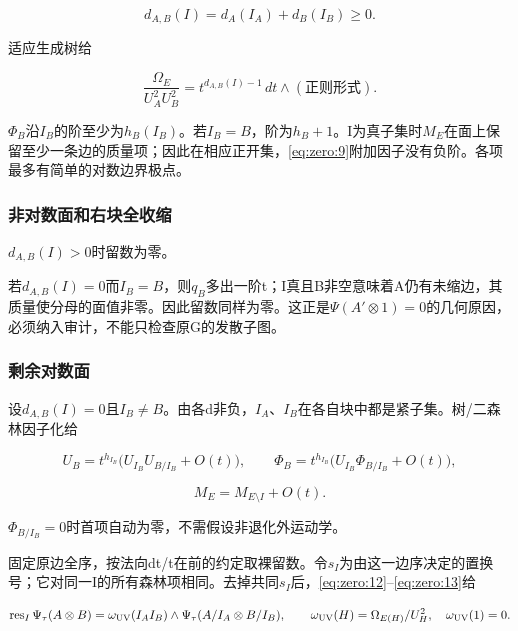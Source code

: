 \documentclass[11pt,a4paper,oneside]{ctexart}
\theoremstyle{cnplain}
\theoremstyle{definition}
\theoremstyle{remark}
\numberwithin{equation}{section}
\begin{document}
\begin{equation}
d_{A,B}(I)=d_A(I_A)+d_B(I_B)\geq0.
\end{equation}

适应生成树给

\begin{equation}
\frac{\Omega_E}{U_A^2U_B^2}
       =t^{d_{A,B}(I)-1}\,dt\wedge(\text{正则形式}).            \label{eq:zero:12}
\end{equation}

\(\Phi _B\)沿\(I_B\)的阶至少为\(h_B(I_B)\)。若\(I_B=B\)，阶为\(h_B+1\)。I为真子集时\(M_E\)在面上保留至少一条边的质量项；因此在相应正开集，\eqref{eq:zero:9}附加因子没有负阶。各项最多有简单的对数边界极点。

\subsubsection{非对数面和右块全收缩}\label{sec:zero:5.1}

\(d_{A,B}(I)>0\)时留数为零。

若\(d_{A,B}(I)=0\)而\(I_B=B\)，则\(q_B\)多出一阶t；I真且B非空意味着A仍有未缩边，其质量使分母的面值非零。因此留数同样为零。这正是\(\Psi (A'\otimes 1)=0\)的几何原因，必须纳入审计，不能只检查原G的发散子图。

\subsubsection{剩余对数面}\label{sec:zero:5.2}

设\(d_{A,B}(I)=0\)且\(I_B\ne B\)。由各d非负，\(I_A\)、\(I_B\)在各自块中都是紧子集。树/二森林因子化给

\begin{equation}
U_B=t^{h_{I_B}}\bigl(U_{I_B}U_{B/I_B}+O(t)\bigr),\qquad
 \Phi_B=t^{h_{I_B}}\bigl(U_{I_B}\Phi_{B/I_B}+O(t)\bigr),         \label{eq:zero:13}
\end{equation}

\begin{equation}
M_E=M_{E\setminus I}+O(t).
\end{equation}

\(\Phi _{B/I_B}=0\)时首项自动为零，不需假设非退化外运动学。

固定原边全序，按法向dt/t在前的约定取裸留数。令\(s_I\)为由这一边序决定的置换号；它对同一I的所有森林项相同。去掉共同\(s_I\)后，\eqref{eq:zero:12}--\eqref{eq:zero:13}给

\begin{equation}
\operatorname{res}_I\Psi_\tau(A\otimes B)
 =\omega_{\rm UV}(I_A I_B)\wedge
             \Psi_\tau(A/I_A\otimes B/I_B),\qquad
 \omega_{\rm UV}(H)=\Omega_{E(H)}/U_H^2,\quad\omega_{\rm UV}(1)=0.       \label{eq:zero:14}
\end{equation}
\end{document}
